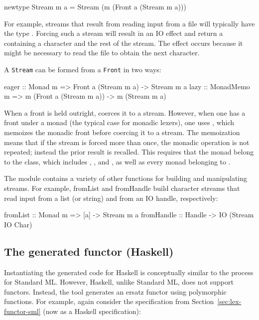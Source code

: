 \documentclass[10pt]{article}
\begin{document}
\begin{strictcode}
\begin{strictcode}
\begin{strictcode}
\begin{strictcode}
\begin{code}
newtype Stream m a =
   Stream (m (Front a (Stream m a)))
\end{code}

For example, streams that result from reading input from a file will
typically have the type .  Forcing such a stream
will result in an IO effect and return a  containing a
character and the rest of the stream.  The effect occurs because it
might be necessary to read the file to obtain the next character.

A {\tt Stream} can be formed from a {\tt Front} in two ways:

\begin{code}
eager :: Monad m => Front a (Stream m a) -> Stream m a
lazy  :: MonadMemo m => m (Front a (Stream m a)) -> m (Stream m a)
\end{code}

When a front is held outright,  coerces it to a stream.
However, when one has a front under a monad (the typical case for
monadic lexers), one uses , which memoizes the monadic front
before coercing it to a stream.  The memoization means that if the
stream is forced more than once, the monadic operation is not
repeated; instead the prior result is recalled.  This requires that
the monad belong to the  class, which includes
, , and , as well as every monad belonging
to .

The  module contains a variety of other functions for
building and manipulating streams.  For example, fromList and
fromHandle build character streams that read input from a list (or
string) and from an IO handle, respectively:

\begin{code}
fromList :: Monad m => [a] -> Stream m a
fromHandle :: Handle -> IO (Stream IO Char)
\end{code}



\subsection{The generated functor (Haskell)}
\label{sec:lex-functor-hs}

Instantiating the generated code for Haskell is conceptually similar
to the process for Standard ML.  However, Haskell, unlike Standard ML,
does not support functors.  Instead, the tool generates an ersatz
functor using polymorphic functions.  For example, again consider the
specification from Section~\ref{sec:lex-functor-sml} (now as a Haskell
specification):


\end{strictcode}
\end{strictcode}
\end{strictcode}
\end{strictcode}
\end{document}
